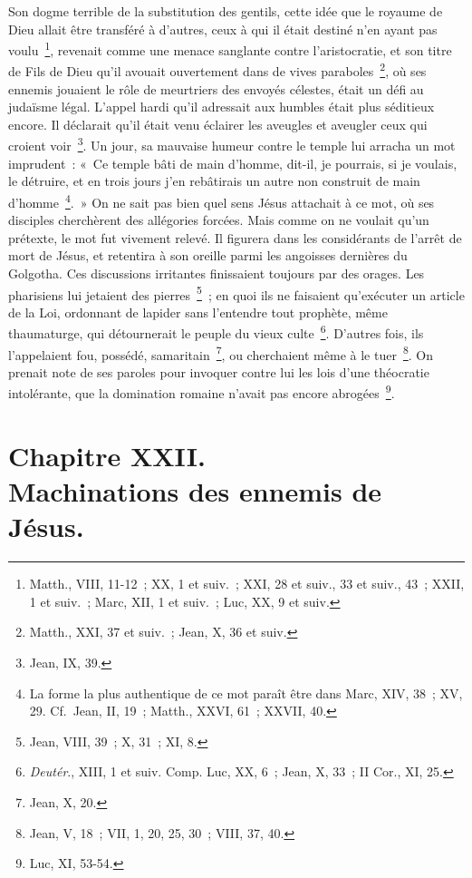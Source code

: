 \documentclass[french,twoside]{book} %
\newenvironment{quoteblock}%
  {\begin{quoting}}
  {\end{quoting}}
\newcommand\chapteropen{} %
\newcommand\chapterclose{} %
\newenvironment{quotebar}{%
    \def\FrameCommand{{\color{rubric!10!}\vrule width 0.5em} \hspace{0.9em}}%
    \def\OuterFrameSep{\itemsep} %
    \MakeFramed {\advance\hsize-\width \FrameRestore}
  }%
  {%
    \endMakeFramed
  }
\renewenvironment{quoteblock}%
  {%
    \savenotes
    \setstretch{0.9}
    \normalfont
    \begin{quotebar}
  }
  {%
    \end{quotebar}
    \spewnotes
  }
\begin{document}
\begin{quoteblock}
 \end{quoteblock}

\noindent Son dogme terrible de la substitution des gentils, cette idée que le royaume de Dieu allait être transféré à d’autres, ceux à qui il était destiné n’en ayant pas voulu \footnote{Matth., VIII, 11-12 ; XX, 1 et suiv. ; XXI, 28 et suiv., 33 et suiv., 43 ; XXII, 1 et suiv. ; Marc, XII, 1 et suiv. ; Luc, XX, 9 et suiv.}, revenait comme une menace sanglante contre l’aristocratie, et son titre de Fils de Dieu qu’il avouait ouvertement dans de vives paraboles \footnote{Matth., XXI, 37 et suiv. ; Jean, X, 36 et suiv.}, où ses ennemis jouaient le rôle de meurtriers des envoyés célestes, était un défi au judaïsme légal. L’appel hardi qu’il adressait aux humbles était plus séditieux encore. Il déclarait qu’il était venu éclairer les aveugles et aveugler ceux qui croient voir \footnote{Jean, IX, 39.}. Un jour, sa mauvaise humeur contre le temple lui arracha un mot imprudent : « Ce temple bâti de main d’homme, dit-il, je pourrais, si je voulais, le détruire, et en trois jours j’en rebâtirais un autre non construit de main d’homme \footnote{La forme la plus authentique de ce mot paraît être dans Marc, XIV, 38 ; XV, 29. Cf. Jean, II, 19 ; Matth., XXVI, 61 ; XXVII, 40.}. » On ne sait pas bien quel sens Jésus attachait à ce mot, où ses disciples cherchèrent des allégories forcées. Mais comme on ne voulait qu’un prétexte, le mot fut vivement relevé. Il figurera dans les considérants de l’arrêt de mort de Jésus, et retentira à son oreille parmi les angoisses dernières du Golgotha. Ces discussions irritantes finissaient toujours par des orages. Les pharisiens lui jetaient des pierres \footnote{Jean, VIII, 39 ; X, 31 ; XI, 8.} ; en quoi ils ne faisaient qu’exécuter un article de la Loi, ordonnant de lapider sans l’entendre tout prophète, même thaumaturge, qui détournerait le peuple du vieux culte \footnote{{\itshape Deutér}., XIII, 1 et suiv. Comp. Luc, XX, 6 ; Jean, X, 33 ; II Cor., XI, 25.}. D’autres fois, ils l’appelaient fou, possédé, samaritain \footnote{Jean, X, 20.}, ou cherchaient même à le tuer \footnote{Jean, V, 18 ; VII, 1, 20, 25, 30 ; VIII, 37, 40.}. On prenait note de ses paroles pour invoquer contre lui les lois d’une théocratie intolérante, que la domination romaine n’avait pas encore abrogées \footnote{Luc, XI, 53-54.}.
\chapterclose


\chapteropen
\chapter[{Chapitre XXII. Machinations des ennemis de Jésus.}]{Chapitre XXII.\\
Machinations des ennemis de Jésus.}\renewcommand{\leftmark}{Chapitre XXII.\\
Machinations des ennemis de Jésus.}
\end{document}
